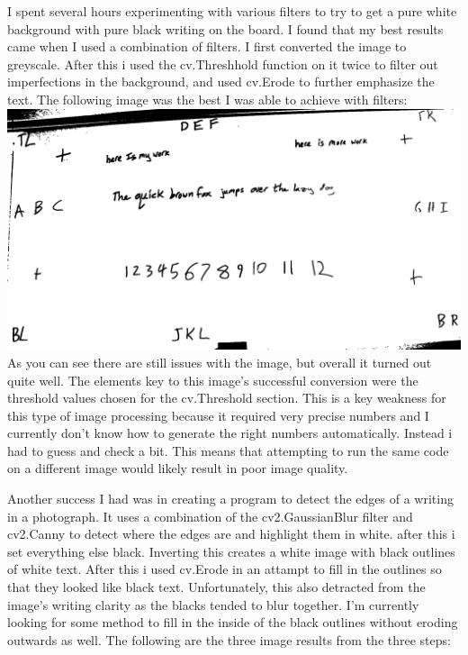 \documentclass[]{article}
\begin{document}
	I spent several hours experimenting with various filters to try to get a pure white background with pure black writing on the board. I found that my best results
	came when I used a combination of filters. I first converted the image to greyscale. After this i used the cv.Threshhold function on it twice to filter out imperfections in the background, and used cv.Erode to further emphasize the text. The following image was the best I was able to achieve with filters: \\
	
		\includegraphics[scale=0.2]{images/bestResult.jpg} \\
	
	As you can see there are still issues with the image, but overall it turned out quite well. The elements key to this image's successful conversion were the threshold values chosen for the cv.Threshold section. This is a key weakness for this type of image processing because it required very precise numbers and I currently don't know how to generate the right numbers automatically. Instead i had to guess and check a bit. This means that attempting to run the same code on a different image would likely result in poor image quality.

	Another success I had was in creating a program to detect the edges of a writing in a photograph. It uses a combination of the cv2.GaussianBlur filter and cv2.Canny to detect where the edges are and highlight them in white. after this i set everything else black. Inverting this creates a white image with black outlines of white text. After this i used cv.Erode in an attampt to fill in the outlines so that they looked like black text. Unfortunately, this also detracted from the image's writing clarity as the blacks tended to blur together. I'm currently looking for some method to fill in the inside of the black outlines without eroding outwards as well. The following are the three image results from the three steps: \\
		
\end{document}
